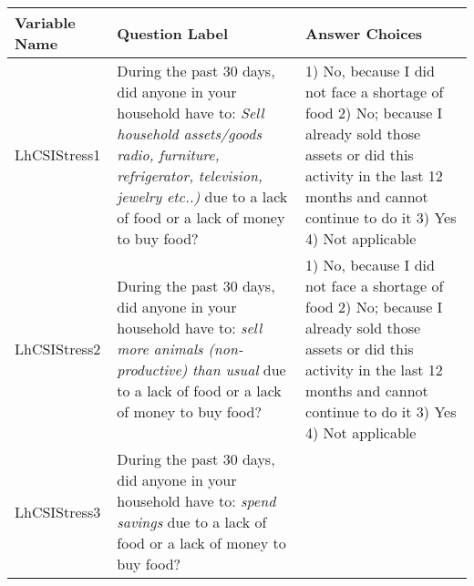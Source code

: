 \documentclass[
]{book}
\begin{document}
\begin{longtable}[]{@{}lll@{}}
\toprule
\begin{minipage}[b]{0.15\columnwidth}\raggedright
Variable Name\strut
\end{minipage} & \begin{minipage}[b]{0.49\columnwidth}\raggedright
Question Label\strut
\end{minipage} & \begin{minipage}[b]{0.27\columnwidth}\raggedright
Answer Choices\strut
\end{minipage}\tabularnewline
\midrule
\endhead
\begin{minipage}[t]{0.15\columnwidth}\raggedright
LhCSIStress1\strut
\end{minipage} & \begin{minipage}[t]{0.49\columnwidth}\raggedright
During the past 30 days, did anyone in your household have to: \emph{Sell household assets/goods radio, furniture, refrigerator, television, jewelry etc..)} due to a lack of food or a lack of money to buy food?\strut
\end{minipage} & \begin{minipage}[t]{0.27\columnwidth}\raggedright
1) No, because I did not face a shortage of food 2) No; because I already sold those assets or did this activity in the last 12 months and cannot continue to do it 3) Yes 4) Not applicable\strut
\end{minipage}\tabularnewline
\begin{minipage}[t]{0.15\columnwidth}\raggedright
LhCSIStress2\strut
\end{minipage} & \begin{minipage}[t]{0.49\columnwidth}\raggedright
During the past 30 days, did anyone in your household have to: \emph{sell more animals (non-productive) than usual} due to a lack of food or a lack of money to buy food?\strut
\end{minipage} & \begin{minipage}[t]{0.27\columnwidth}\raggedright
1) No, because I did not face a shortage of food 2) No; because I already sold those assets or did this activity in the last 12 months and cannot continue to do it 3) Yes 4) Not applicable\strut
\end{minipage}\tabularnewline
\begin{minipage}[t]{0.15\columnwidth}\raggedright
LhCSIStress3\strut
\end{minipage} & \begin{minipage}[t]{0.49\columnwidth}\raggedright
During the past 30 days, did anyone in your household have to: \emph{spend savings} due to a lack of food or a lack of money to buy food?\strut

\end{minipage}
\end{longtable}
\end{document}
